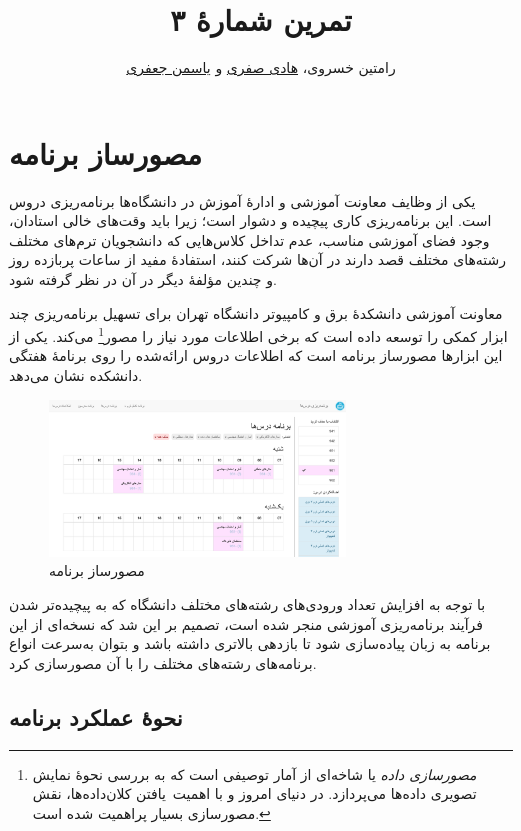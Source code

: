 \documentclass{utap}
\title{تمرین شمارهٔ ۳}
\author{رامتین خسروی، \href{mailto:hadi.safari@ut.ac.ir?subject=[AP\%20S98 A3]\%20}{هادی صفری} و \href{mailto:ys.jafari@ut.ac.ir?subject=[AP\%20S98 A3]\%20}{یاسمن جعفری}}
\begin{document}
    \maketitle

    \section{مصورساز برنامه}

    یکی از وظایف معاونت آموزشی و ادارهٔ آموزش در دانشگاه‌ها برنامه‌ریزی دروس است. این برنامه‌ریزی کاری پیچیده و دشوار است؛ زیرا باید وقت‌های خالی استادان، وجود فضای آموزشی مناسب، عدم تداخل کلاس‌هایی که دانشجویان ترم‌های مختلف رشته‌های مختلف قصد دارند در آن‌ها شرکت کنند، استفادهٔ مفید از ساعات پربازده روز و چندین مؤلفهٔ دیگر در آن در نظر گرفته شود.

    معاونت آموزشی دانشکدهٔ برق و کامپیوتر دانشگاه تهران برای تسهیل برنامه‌ریزی چند ابزار کمکی را توسعه داده است که برخی اطلاعات مورد نیاز را مصور\footnote{\textit{مصورسازی داده} یا  شاخه‌ای از آمار توصیفی است که به بررسی نحوهٔ نمایش تصویری داده‌ها می‌پردازد. در دنیای امروز و با اهمیت~یافتن کلان‌داده‌ها، نقش مصورسازی بسیار پراهمیت شده است.} می‌کند. یکی از این ابزارها مصورساز برنامه است که اطلاعات دروس ارائه‌شده را روی برنامهٔ هفتگی دانشکده نشان می‌دهد.

    \begin{figure}[hb]
        \centering
        \includegraphics[width=0.7\textwidth]{webversion.png}
        \caption{مصورساز برنامه}
    \end{figure}

    با توجه به افزایش تعداد ورودی‌های رشته‌های مختلف دانشگاه که به پیچیده‌تر شدن فرآیند برنامه‌ریزی آموزشی منجر شده است، تصمیم بر این شد که نسخه‌ای از این برنامه به زبان  پیاده‌سازی شود تا بازدهی بالاتری داشته باشد و بتوان به‌سرعت انواع برنامه‌های رشته‌های مختلف را با آن مصورسازی کرد.

    \subsection{نحوهٔ عملکرد برنامه}
\end{document}

